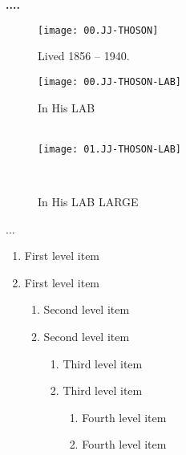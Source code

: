 \documentclass[../main.tex]{subfiles}
\begin{document}
\textbf{....}
        \begin{figure}[bh]
        \centering
        \texttt{[image: 00.JJ-THOSON]} 
        \caption{Lived 1856 – 1940. } 
        \texttt{[image: 00.JJ-THOSON-LAB]} 
        \caption{ In His LAB } \\
        \texttt{[image: 01.JJ-THOSON-LAB]} 
         \caption{ In His LAB LARGE} \\
        \label{fig:img1}
        
    \end{figure}
    ...
    \begin{enumerate}
   \item First level item
   \item First level item
   \begin{enumerate}
     \item Second level item
     \item Second level item
     \begin{enumerate}
       \item Third level item
       \item Third level item
       \begin{enumerate}
         \item Fourth level item
         \item Fourth level item
       \end{enumerate}
     \end{enumerate}
   \end{enumerate}
 \end{enumerate}
    
    
\end{document}
